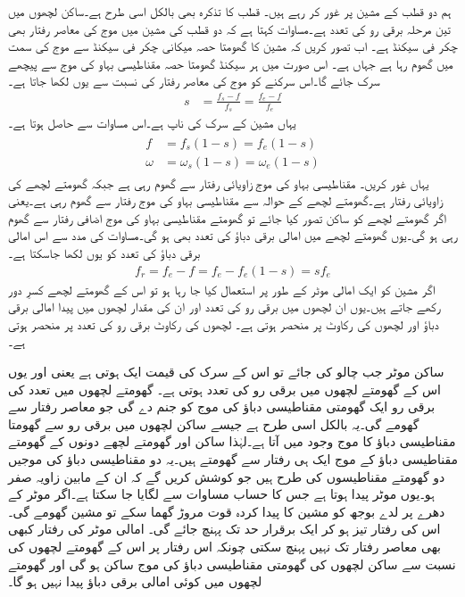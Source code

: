 ہم دو قطب کے مشین پر غور کر رہے ہیں۔ قطب کا تذکرہ بھی بالکل اسی طرح ہے۔ساکن لچھوں میں تین مرحلہ برقی رو کی تعدد  ہے۔مساوات   کہتا ہے کہ دو قطب کی مشین میں موج کی معاصر رفتار بھی  چکر فی سیکنڈ ہے۔ اب تصور کریں کہ مشین کا گھومتا حصہ  میکانی چکر فی سیکنڈ سے موج کی سمت میں گھوم رہا ہے جہاں  ہے۔ اس صورت میں ہر سیکنڈ گھومتا حصہ مقناطیسی بہاو کی موج سے پیچھے سرک جائے گا۔اس سرکنے کو موج کی معاصر رفتار کی نسبت سے یوں لکھا جاتا ہے۔
\begin{align}
s&=\frac{f_s-f}{f_s}=\frac{f_e-f}{f_e}
\end{align}
یہاں  مشین کے سرک کی ناپ ہے۔اس مساوات سے حاصل ہوتا ہے۔
\begin{gather}
\begin{aligned}\label{مساوات_امالی_سرک_اور_تعدد}
f&=f_s (1-s)=f_e(1-s)\\
\omega&=\omega_s(1-s)=\omega_e(1-s)
\end{aligned}
\end{gather}
یہاں غور کریں۔ مقناطیسی بہاو کی موج  زاویائی رفتار سے گھوم رہی ہے جبکہ  گھومتے لچھے کی زاویائی رفتار  ہے۔گھومتے لچھے کے حوالہ سے مقناطیسی بہاو کی موج  رفتار سے گھوم رہی ہے۔یعنی اگر گھومتے لچھے کو ساکن تصور کیا جائے تو گھومتے مقناطیسی بہاو کی موج  اضافی رفتار سے گھوم رہی ہو گی۔یوں گھومتے لچھے میں امالی برقی دباؤ کی تعدد بھی  ہو گی۔مساوات   کی مدد سے اس امالی برقی دباؤ کی تعدد  کو یوں لکھا جاسکتا ہے۔
\begin{align}\label{مساوات_امالی-سرک_تعلق_ب}
f_r=f_e-f=f_e-f_e(1-s)=s f_e
\end{align}
اگر مشین کو ایک امالی موٹر کے طور پر استعمال کیا جا رہا ہو تو اس کے گھومتے لچھے کسرِ دور رکھے جاتے ہیں۔یوں ان لچھوں میں برقی رو کی تعدد  اور ان کی مقدار لچھوں میں پیدا امالی برقی دباؤ اور لچھوں کی رکاوٹ پر منحصر ہوتی ہے۔ لچھوں کی رکاوٹ برقی رو کی تعدد پر منحصر ہوتی ہے۔

ساکن موٹر جب چالو کی جائے تو اس کے سرک  کی قیمت  ایک ہوتی ہے یعنی  اور یوں اس کے گھومتے لچھوں میں برقی رو کی تعدد  ہوتی ہے۔ گھومتے لچھوں میں   تعدد کی برقی رو ایک گھومتی مقناطیسی دباؤ کی موج کو جنم دے گی جو معاصر رفتار سے گھومے گی۔یہ بالکل اسی طرح ہے جیسے ساکن لچھوں میں برقی رو سے گھومتا مقناطیسی دباؤ کا موج وجود میں آتا ہے۔لہٰذا ساکن اور گھومتے لچھے دونوں کے گھومتے مقناطیسی دباؤ کے موج ایک ہی رفتار سے گھومتے ہیں۔یہ دو مقناطیسی دباؤ کی موجیں دو گھومتے مقناطیسوں کی طرح ہیں جو کوشش کریں گے کہ ان کے مابین زاویہ صفر ہو۔یوں موٹر  پیدا ہوتا ہے جس کا حساب  مساوات  سے لگایا جا سکتا ہے۔اگر موٹر کے دھرے پر لدے بوجھ کو مشین کا پیدا کردہ قوت مروڑ گھما سکے تو مشین گھومے گی۔اس کی رفتار تیز ہو کر ایک برقرار حد تک پہنچ جائے گی۔ امالی موٹر کی رفتار کبھی بھی معاصر رفتار تک نہیں پہنچ سکتی چونکہ اس رفتار پر اس کے گھومتے لچھوں کی نسبت سے ساکن لچھوں کی گھومتی مقناطیسی دباؤ کی موج ساکن ہو گی اور گھومتے لچھوں میں کوئی امالی برقی دباؤ پیدا نہیں ہو گا۔


